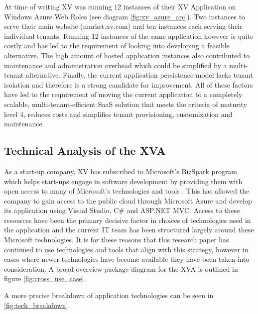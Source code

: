 At time of writing XV was running 12 instances of their XV Application on Windows Azure Web Roles (see diagram \ref{fig:xv_azure_arc}). Two instances to serve their main website (market.xv.com) and ten instances each serving their individual tenants. Running 12 instances of the same application however is quite costly and has led to the requirement of looking into developing a feasible alternative. The high amount of hosted application instances also contributed to maintenance and administration overhead which could be simplified by a multi-tenant alternative. Finally, the current application persistence model lacks tenant isolation and therefore is a strong candidate for improvement. All of these factors have led to the requirement of moving the current application to a completely scalable, multi-tenant-efficient SaaS solution that meets the criteria of maturity level 4, reduces costs and simplifies tenant provisioning, customization and maintenance.



\subsection{Technical Analysis of the XVA}
\label{sec:techconst}
As a start-up company, XV has subscribed to Microsoft's BizSpark program which helps start-ups engage in software development by providing them with open access to many of Microsoft's technologies and tools \cite{BizSpark}. This has allowed the company to gain access to the public cloud through Microsoft Azure and develop its application using Visual Studio, C\# and ASP.NET MVC. Access to these resources have been the primary decisive factor in choices of technologies used in the application and the current IT team has been structured largely around these Microsoft technologies. It is for these reasons that this research paper has continued to use technologies and tools that align with this strategy, however in cases where newer technologies have become available they have been taken into consideration. A broad overview package diagram for the XVA is outlined in figure \ref{fig:cross_use_case}.
 
 
A more precise breakdown of application technologies can be seen in \ref{fig:tech_breakdown}.


